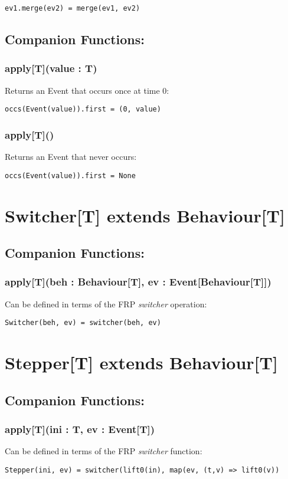 \begin{verbatim}
ev1.merge(ev2) = merge(ev1, ev2)
\end{verbatim}   

 \subsection*{Companion Functions:}
  \subsubsection*{apply[T](value : T)}
    Returns an Event that occurs once at time 0:
  
\begin{verbatim}
occs(Event(value)).first = (0, value) 
\end{verbatim} 

  \subsubsection*{apply[T]()}
    Returns an Event that never occurs:

\begin{verbatim}
occs(Event(value)).first = None
\end{verbatim} 

   \section*{Switcher[T] extends Behaviour[T]}
    \subsection*{Companion Functions:}
      \subsubsection*{apply[T](beh : Behaviour[T], ev : Event[Behaviour[T]])}
        Can be defined in terms of the FRP \emph{switcher}
        operation:

\begin{verbatim}
Switcher(beh, ev) = switcher(beh, ev)
\end{verbatim}   

  \section*{Stepper[T] extends Behaviour[T]}
    \subsection*{Companion Functions:}
      \subsubsection*{apply[T](ini : T, ev : Event[T])}
        Can be defined in terms of the FRP \emph{switcher} function:

\begin{verbatim}
Stepper(ini, ev) = switcher(lift0(in), map(ev, (t,v) => lift0(v))
\end{verbatim}